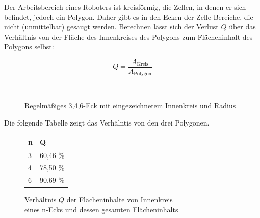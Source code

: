 \documentclass{article}
\begin{document}
Der Arbeitsbereich eines Roboters ist kreisförmig, die Zellen, in denen er
sich befindet, jedoch ein Polygon. Daher gibt es in den Ecken der Zelle 
Bereiche, die nicht (unmittelbar) gesaugt werden. Berechnen lässt 
sich der Verlust $Q$ über das Verhältnis von der Fläche des Innenkreises 
des Polygons zum Flächeninhalt des Polygons selbst:

\begin{equation}
  Q = \frac{A_\text{Kreis} }{A_\text{Polygon}}
\end{equation}

\begin{figure}[!ht]
  \centering
  \qquad
  \qquad
  \\
  \caption{Regelmäßiges 3,4,6-Eck mit eingezeichnetem Innenkreis und Radius}
  \label{fig:floor_quotient_circle_polygon}
\end{figure}

Die folgende Tabelle zeigt das Verhälntis von den drei Polygonen. 


\begin{figure}[ht]
\begin{center}
    \begin{tabular}{ l | l}
    n & Q \\ \hline
    3 & 60,46 \% \\
    4 & 78,50 \% \\
    6 & 90,69 \% \\
    \end{tabular}
    \caption{Verhältnis $Q$ der Flächeninhalte von Innenkreis \\ eines n-Ecks und dessen gesamten Flächeninhalts}
    \end{center}
\end{figure}
\end{document}
